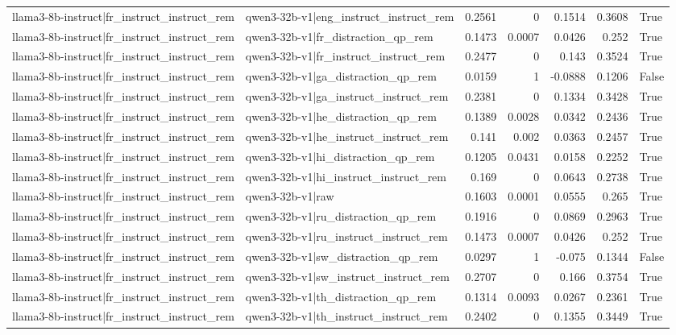 \begin{table}
\begin{tabular}{l l r r r r l}
llama3-8b-instruct|fr_instruct_instruct_rem & qwen3-32b-v1|eng_instruct_instruct_rem & 0.2561 & 0 & 0.1514 & 0.3608 & True \\
llama3-8b-instruct|fr_instruct_instruct_rem & qwen3-32b-v1|fr_distraction_qp_rem & 0.1473 & 0.0007 & 0.0426 & 0.252 & True \\
llama3-8b-instruct|fr_instruct_instruct_rem & qwen3-32b-v1|fr_instruct_instruct_rem & 0.2477 & 0 & 0.143 & 0.3524 & True \\
llama3-8b-instruct|fr_instruct_instruct_rem & qwen3-32b-v1|ga_distraction_qp_rem & 0.0159 & 1 & -0.0888 & 0.1206 & False \\
llama3-8b-instruct|fr_instruct_instruct_rem & qwen3-32b-v1|ga_instruct_instruct_rem & 0.2381 & 0 & 0.1334 & 0.3428 & True \\
llama3-8b-instruct|fr_instruct_instruct_rem & qwen3-32b-v1|he_distraction_qp_rem & 0.1389 & 0.0028 & 0.0342 & 0.2436 & True \\
llama3-8b-instruct|fr_instruct_instruct_rem & qwen3-32b-v1|he_instruct_instruct_rem & 0.141 & 0.002 & 0.0363 & 0.2457 & True \\
llama3-8b-instruct|fr_instruct_instruct_rem & qwen3-32b-v1|hi_distraction_qp_rem & 0.1205 & 0.0431 & 0.0158 & 0.2252 & True \\
llama3-8b-instruct|fr_instruct_instruct_rem & qwen3-32b-v1|hi_instruct_instruct_rem & 0.169 & 0 & 0.0643 & 0.2738 & True \\
llama3-8b-instruct|fr_instruct_instruct_rem & qwen3-32b-v1|raw & 0.1603 & 0.0001 & 0.0555 & 0.265 & True \\
llama3-8b-instruct|fr_instruct_instruct_rem & qwen3-32b-v1|ru_distraction_qp_rem & 0.1916 & 0 & 0.0869 & 0.2963 & True \\
llama3-8b-instruct|fr_instruct_instruct_rem & qwen3-32b-v1|ru_instruct_instruct_rem & 0.1473 & 0.0007 & 0.0426 & 0.252 & True \\
llama3-8b-instruct|fr_instruct_instruct_rem & qwen3-32b-v1|sw_distraction_qp_rem & 0.0297 & 1 & -0.075 & 0.1344 & False \\
llama3-8b-instruct|fr_instruct_instruct_rem & qwen3-32b-v1|sw_instruct_instruct_rem & 0.2707 & 0 & 0.166 & 0.3754 & True \\
llama3-8b-instruct|fr_instruct_instruct_rem & qwen3-32b-v1|th_distraction_qp_rem & 0.1314 & 0.0093 & 0.0267 & 0.2361 & True \\
llama3-8b-instruct|fr_instruct_instruct_rem & qwen3-32b-v1|th_instruct_instruct_rem & 0.2402 & 0 & 0.1355 & 0.3449 & True \\

\end{tabular}
\end{table}
